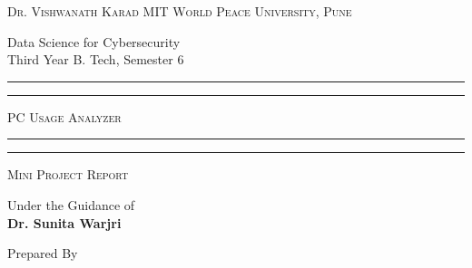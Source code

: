 \documentclass[openany]{report}
\begin{document}
\begin{titlepage}
    \centering


    \huge\textsc{
        Dr. Vishwanath Karad MIT World Peace University, Pune
    }\\

    \vspace{0.75\baselineskip} %

    \LARGE{
        Data Science for Cybersecurity\\
        Third Year B. Tech, Semester 6\\
    }

    \vfill %


    \rule{\textwidth}{1.6pt}\vspace*{-\baselineskip}\vspace*{2pt}
    \rule{\textwidth}{0.6pt}
    \vspace{0.75\baselineskip} %



    \huge{\textsc{
            PC Usage Analyzer
        }} \\



    \vspace{0.5\baselineskip} %
    \rule{\textwidth}{0.6pt}\vspace*{-\baselineskip}\vspace*{2.8pt}
    \rule{\textwidth}{1.6pt}

    \vspace{1\baselineskip} %


    \LARGE\textsc{
        Mini Project Report
    } %


    \vspace{0.5\baselineskip} %
    Under the Guidance of\\
    \Large{
        \textbf{Dr. Sunita Warjri}
    }
    \vfill

    Prepared By
    \vspace{0.5\baselineskip} %


\end{titlepage}
\end{document}
